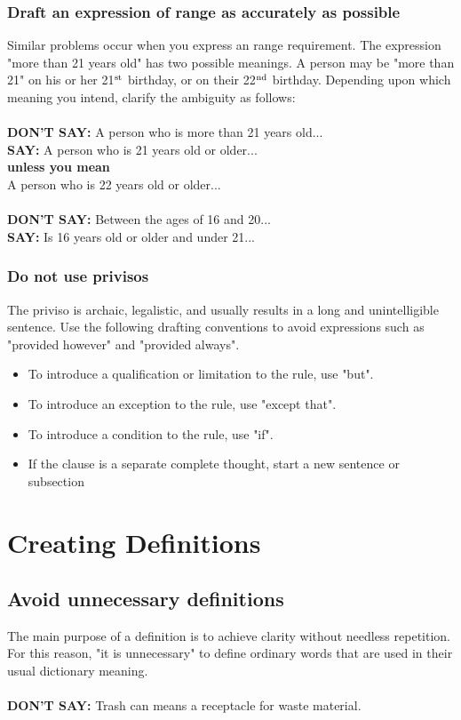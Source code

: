 \documentclass[12pt, letterpaper]{report}
\begin{document}
\begin{linenumbers}
        \subsection{Draft an expression of range as accurately as possible}
             Similar problems occur when you express an range requirement. The expression "more than 21 years old" has two possible meanings. A person may be "more than 21" on his or her 21$^{\rm st}$ birthday, or on their 22$\rm ^{nd}$ birthday. Depending upon which meaning you intend, clarify the ambiguity as follows:\\\\
             \textbf{DON'T SAY:} A person who is more than 21 years old...\\
             \textbf{SAY: }A person who is 21 years old or older...\\
             \textbf{unless you mean}\\
             A person who is 22 years old or older...\\\\
             \textbf{DON'T SAY: }Between the ages of 16 and 20...\\
             \textbf{SAY: }Is 16 years old or older and under 21...
         \subsection{Do not use privisos} 
         The priviso is archaic, legalistic, and usually results in a long and unintelligible sentence. Use the following drafting conventions to avoid expressions such as "provided however" and "provided always".
        \begin{itemize}
            \item To introduce a qualification or limitation to the rule, use "but".
            \item To introduce an exception to the rule, use "except that".
            \item To introduce a condition to the rule, use "if".
            \item If the clause is a separate complete thought, start a new sentence or subsection
        \end{itemize}
    \chapter{Creating Definitions}
    \section{Avoid unnecessary definitions} The main purpose of a definition is to achieve clarity without needless repetition. For this reason, "it is unnecessary" to define ordinary words that are used in their usual dictionary meaning.\\\\
\textbf{DON'T SAY: }Trash can means a receptacle for waste material.

\end{linenumbers}
\end{document}
